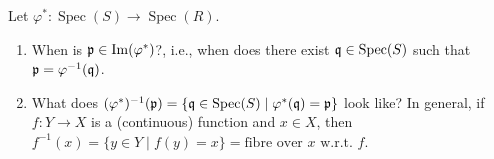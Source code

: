 \begin{question}\label{3.22}
    Let $\varphi^*: \operatorname{Spec}(S) \to \operatorname{Spec}(R)$.
    \begin{enumerate}
        \item When is $\mathfrak{p} \in \operatorname{Im}(\varphi^*)$?, i.e., when does there exist $\mathfrak{q} \in \operatorname{Spec}(S)$ such that $\mathfrak{p}  = \varphi^{-1}(\mathfrak{q})$.
        \item What does $(\varphi^*)^{-1}(\mathfrak{p}) = \{\mathfrak{q} \in \operatorname{Spec}(S) \mid \varphi^*(\mathfrak{q}) = \mathfrak{p}\}$ look like? In general, if $f: Y \to X$ is a (continuous) function and $x \in X$, then $f^{-1}(x) = \{y \in Y \mid f(y) = x\} = \text{fibre over $x$ w.r.t. $f$}$.
    \end{enumerate}
\end{question}

